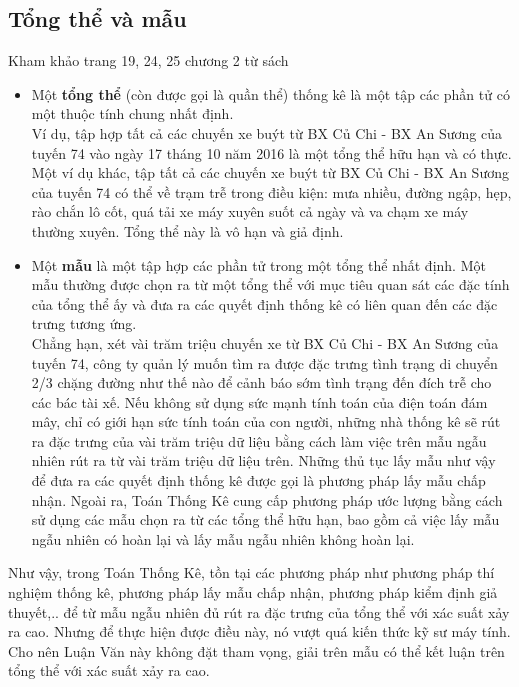 \documentclass[a4paper, 13pt]{report}
\begin{document}
\subsection*{Tổng thể và mẫu}
Kham khảo trang 19, 24, 25 chương 2 từ sách \cite{TKCNUDR}
\begin{itemize}
\item Một \textbf{tổng thể} (còn được gọi là quần thể) thống kê là một tập các phần tử có một thuộc tính chung nhất định. 
\\Ví dụ, tập hợp tất cả các chuyến xe buýt từ BX Củ Chi - BX An Sương của tuyến 74 vào ngày 17 tháng 10 năm 2016 là một tổng thể hữu hạn và có thực.\\
Một ví dụ khác, tập tất cả các chuyến xe buýt từ BX Củ Chi - BX An Sương của tuyến 74 có thể về trạm trễ trong điều kiện: mưa nhiều, đường ngập, hẹp, rào chắn lô cốt, quá tải xe máy xuyên suốt cả ngày và va chạm xe máy thường xuyên. Tổng thể này là vô hạn và giả định.
\item Một \textbf{mẫu} là một tập hợp các phần tử trong một tổng thể nhất định. Một mẫu thường được chọn ra từ một tổng thể với mục tiêu quan sát các đặc tính của tổng thể ấy và đưa ra các quyết định thống kê có liên quan đến các đặc trưng tương ứng. \\
Chẳng hạn, xét vài trăm triệu chuyến xe từ BX Củ Chi - BX An Sương của tuyến 74, công ty quản lý muốn tìm ra được đặc trưng tình trạng di chuyển 2/3 chặng đường như thế nào để cảnh báo sớm tình trạng đến đích trễ cho các bác tài xế. Nếu không sử dụng sức mạnh tính toán của điện toán đám mây, chỉ có giới hạn sức tính toán của con người, những nhà thống kê sẽ rút ra đặc trưng của vài trăm triệu dữ liệu bằng cách làm việc trên mẫu ngẫu nhiên rút ra từ vài trăm triệu dữ liệu trên. Những thủ tục lấy mẫu như vậy để đưa ra các quyết định thống kê được gọi là phương pháp lấy mẫu chấp nhận. Ngoài ra, Toán Thống Kê cung cấp phương pháp ước lượng bằng cách sử dụng các mẫu chọn ra từ các tổng thể hữu hạn, bao gồm cả việc lấy mẫu ngẫu nhiên có hoàn lại và lấy mẫu ngẫu nhiên không hoàn lại.\\
\end{itemize}
Như vậy, trong Toán Thống Kê, tồn tại các phương pháp như phương pháp thí nghiệm thống kê, phương pháp lấy mẫu chấp nhận, phương pháp kiểm định giả thuyết,.. để từ mẫu ngẫu nhiên đủ rút ra đặc trưng của tổng thể với xác suất xảy ra cao. Nhưng để thực hiện được điều này, nó vượt quá kiến thức kỹ sư máy tính. Cho nên Luận Văn này không đặt tham vọng, giải trên mẫu có thể kết luận trên tổng thể với xác suất xảy ra cao.\\
\end{document}
